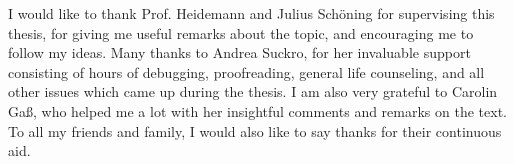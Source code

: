 I would like to thank Prof. Heidemann and Julius Schöning for supervising this
thesis, for giving me useful remarks about the topic, and encouraging me to
follow my ideas. Many thanks to Andrea Suckro, for her invaluable support
consisting of hours of debugging, proofreading, general life counseling, and
all other issues which came up during the thesis. I am also very grateful to
Carolin Gaß, who helped me a lot with her insightful comments and remarks on
the text. To all my friends and family, I would also like to say thanks for
their continuous aid.


